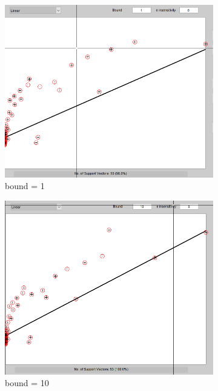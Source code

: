 \documentclass[11pt,oneside,a4paper]{article}
\begin{document}
\begin{figure}[H]
\begin{subfigure}[b]{0.4\textwidth}
		\includegraphics[width=\textwidth]{../Figures/linear_b_11}
		\caption{bound = 1}
	\end{subfigure}
	\begin{subfigure}[b]{0.4\textwidth}
		\includegraphics[width=\textwidth]{../Figures/linear_b_10}
		\caption{bound = 10}
	\end{subfigure}
	\begin{subfigure}[b]{0.4\textwidth}

\end{subfigure}
\end{figure}
\end{document}
